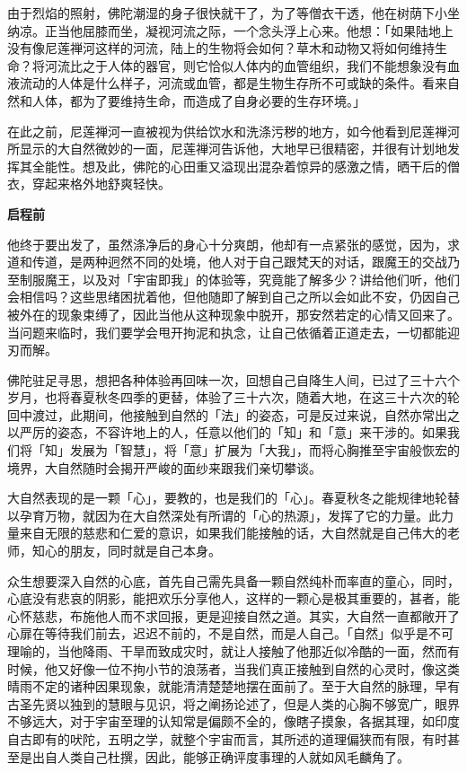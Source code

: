 \documentclass[twoside,openany]{book}
\newcommand{\mt}[1]{\textbullet \textbf{#1}}
\begin{document}
由于烈焰的照射，佛陀潮湿的身子很快就干了，为了等僧衣干透，他在树荫下小坐纳凉。正当他屈膝而坐，凝视河流之际，一个念头浮上心来。他想：「如果陆地上没有像尼莲禅河这样的河流，陆上的生物将会如何？草木和动物又将如何维持生命？将河流比之于人体的器官，则它恰似人体内的血管组织，我们不能想象没有血液流动的人体是什么样子，河流或血管，都是生物生存所不可或缺的条件。看来自然和人体，都为了要维持生命，而造成了自身必要的生存环境。」

在此之前，尼莲禅河一直被视为供给饮水和洗涤污秽的地方，如今他看到尼莲禅河所显示的大自然微妙的一面，尼莲禅河告诉他，大地早已很精密，并很有计划地发挥其全能性。想及此，佛陀的心田重又溢现出混杂着惊异的感激之情，晒干后的僧衣，穿起来格外地舒爽轻快。

\mt{启程前}

他终于要出发了，虽然涤净后的身心十分爽朗，他却有一点紧张的感觉，因为，求道和传道，是两种迥然不同的处境，他人对于自己跟梵天的对话，跟魔王的交战乃至制服魔王，以及对「宇宙即我」的体验等，究竟能了解多少？讲给他们听，他们会相信吗？这些思绪困扰着他，但他随即了解到自己之所以会如此不安，仍因自己被外在的现象束缚了，因此当他从这种现象中脱开，那安然若定的心情又回来了。当问题来临时，我们要学会甩开拘泥和执念，让自己依循着正道走去，一切都能迎刃而解。

佛陀驻足寻思，想把各种体验再回味一次，回想自己自降生人间，已过了三十六个岁月，也将春夏秋冬四季的更替，体验了三十六次，随着大地，在这三十六次的轮回中渡过，此期间，他接触到自然的「法」的姿态，可是反过来说，自然亦常出之以严厉的姿态，不容许地上的人，任意以他们的「知」和「意」来干涉的。如果我们将「知」发展为「智慧」，将「意」扩展为「大我」，而将心胸推至宇宙般恢宏的境界，大自然随时会揭开严峻的面纱来跟我们亲切攀谈。

大自然表现的是一颗「心」，要教的，也是我们的「心」。春夏秋冬之能规律地轮替以孕育万物，就因为在大自然深处有所谓的「心的热源」，发挥了它的力量。此力量来自无限的慈悲和仁爱的意识，如果我们能接触的话，大自然就是自己伟大的老师，知心的朋友，同时就是自己本身。

众生想要深入自然的心底，首先自己需先具备一颗自然纯朴而率直的童心，同时，心底没有悲哀的阴影，能把欢乐分享他人，这样的一颗心是极其重要的，甚者，能心怀慈悲，布施他人而不求回报，更是迎接自然之道。其实，大自然一直都敞开了心扉在等待我们前去，迟迟不前的，不是自然，而是人自己。「自然」似乎是不可理喻的，当他降雨、干旱而致成灾时，就让人接触了他那近似冷酷的一面，然而有时候，他又好像一位不拘小节的浪荡者，当我们真正接触到自然的心灵时，像这类晴雨不定的诸种因果现象，就能清清楚楚地摆在面前了。至于大自然的脉理，早有古圣先贤以独到的慧眼与见识，将之阐扬论述了，但是人类的心胸不够宽广，眼界不够远大，对于宇宙至理的认知常是偏颇不全的，像瞎子摸象，各据其理，如印度自古即有的吠陀，五明之学，就整个宇宙而言，其所述的道理偏狭而有限，有时甚至是出自人类自己杜撰，因此，能够正确评度事理的人就如风毛麟角了。
\end{document}
